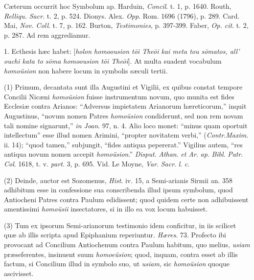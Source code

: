Cæterum occurrit hoc Symbolum ap. Harduin, \emph{Concil}.
t. 1, p. 1640. Routh, \emph{Relliqu. Sacr}. t. 2, p. 524. Dionys.
Alex. \emph{Opp}. Rom. 1696 (1796), p. 289. Card. Mai, \emph{Nov. Coll}.
t. 7, p. 162. Burton, \emph{Testimonies}, p. 397-399. Faber, \emph{Op.
cit}. t. 2, p. 287. Ad rem aggrediamur.

1. Ecthesis hæc habet: [\emph{holon homoousion t\={o}i
The\={o}i kai meta tou s\={o}matos, all' ouchi kata to s\={o}ma
homoousion t\={o}i The\={o}i}]. At multa suadent vocabulum \emph{homoüsion}
non habere locum in symbolis sæculi tertii.

(1) Primum, decantata sunt illa Augustini et
Vigilii, ex quibus constat tempore Concilii Nicæni \emph{homoüsion}
fuisse instrumentum novum, quo munita est fides Ecclesiæ contra
Arianos: ``Adversus impietatem Arianorum hæreticorum,'' inquit
Augustinus, ``novum nomen Patres \emph{homoüsion} condiderunt, sed non
rem novam tali nomine signarunt,'' \emph{in Joan}. 97, n. 4. Alio loco
monet: ``minus quam oportuit intellectum'' esse illud nomen Arimini, ``propter
novitatem verbi,'' (\emph{Contr}.\emph{Maxim}. ii. 14); ``quod tamen,''
subjungit, ``fides antiqua pepererat.'' Vigilius autem, ``res antiqua
novum nomen accepit \emph{homoüsion}.'' \emph{Disput}. \emph{Athan}. \emph{et
Ar}. \emph{ap}. \emph{Bibl}. \emph{Patr}. \emph{Col}. 1618, t. v. \emph{part}.
3, p. 695. Vid. Le Moyne, \emph{Var}. \emph{Sacr}. \emph{l}. \emph{c}.

(2) Deinde, auctor est Sozomenus, \emph{Hist}.
iv. 15, a Semi-arianis Sirmii an. 358 adhibitum esse in confessione
sua conscribenda illud ipsum symbolum, quod Antiocheni Patres contra
Paulum edidissent; quod quidem certe non adhibuissent amentissimi \emph{homoüsii}
insectatores, si in illo ea vox locum habuisset.

(3) Tum ex ipsorum Semi-arianorum testimonio idem
conficitur, in iis scilicet quæ ab illis scripta apud Epiphanium
reperiuntur. \emph{Hæres}. 73. Profecto ibi provocant ad Concilium
Antiochenum contra Paulum habitum, quo melius, \emph{usiam} præseferentes,
insinuent suum \emph{homoeüsion}; quod, inquam, contra esset ab illis
factum, si Concilium illud in symbolo suo, ut \emph{usiam}, sic \emph{homoüsion}
quoque ascivisset.

